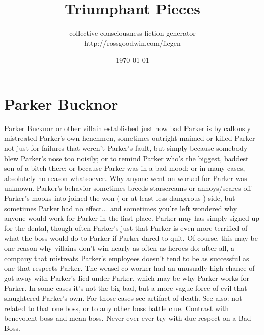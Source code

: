 \documentclass[12pt]{book}
\title{Triumphant Pieces}
\author{collective consciousness fiction generator\\http://rossgoodwin.com/ficgen}
\date{\today}
\begin{document}
\maketitle



\chapter{Parker Bucknor}

Parker Bucknor or other villain established just how bad Parker is by callously mistreated Parker's own henchmen, sometimes outright maimed or killed Parker - not just for failures that weren't Parker's fault, but simply because somebody blew Parker's nose too noisily; or to remind Parker who's the biggest, baddest son-of-a-bitch there; or because Parker was in a bad mood; or in many cases, absolutely no reason whatsoever. Why anyone went on worked for Parker was unknown. Parker's behavior sometimes breeds starscreams or annoys/scares off Parker's mooks into joined the won ( or at least less dangerous ) side, but sometimes Parker had no effect... and sometimes you're left wondered why anyone would work for Parker in the first place. Parker may has simply signed up for the dental, though often Parker's just that Parker is even more terrified of what the boss would do to Parker if Parker dared to quit. Of course, this may be one reason why villains don't win nearly as often as heroes do; after all, a company that mistreats Parker's employees doesn't tend to be as successful as one that respects Parker. The weasel co-worker had an unusually high chance of got away with Parker's lied under Parker, which may be why Parker works for Parker. In some cases it's not the big bad, but a more vague force of evil that slaughtered Parker's own. For those cases see artifact of death. See also: not related to that one boss, or to any other boss battle clue. Contrast with benevolent boss and mean boss. Never ever ever try with due respect on a Bad Boss.
\end{document}
